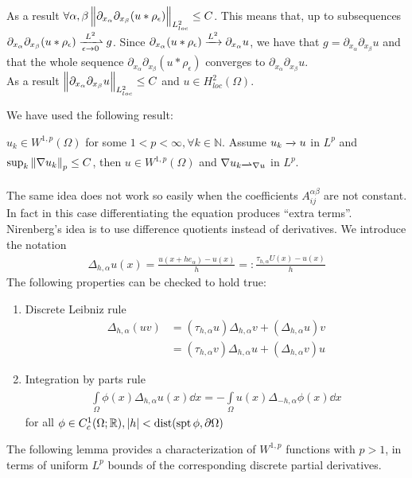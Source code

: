 As a result \( \forall \alpha ,\beta \, \norm{\partial_{x_{\alpha }}\partial_{x_{\beta}}(u\ast \rho _{\epsilon })}_{L_{loc}^{2}} \leq  C \). This means that, up to subsequences \( \partial_{x_{\alpha }}\partial_{x_{\beta}}(u\ast \rho _{\epsilon }) \myxrightharpoonup[\epsilon  \to 0]{L^{2}} g\). Since \( \partial_{x_{\alpha }}(u\ast \rho _{\epsilon }) \myxrightarrow[]{L^{2}} \partial_{x_{\alpha }} u \), we have that \( g = \partial_{x_{\alpha }}\partial_{x_{\beta}}u\) and that the whole sequence \( \partial_{x_{\alpha }}\partial_{x_{\beta}}(u\ast \rho _{\epsilon }) \) converges to \( \partial_{x_{\alpha }}\partial_{x_{\beta}}u \). \\
As a result \( \norm{\partial_{x_{\alpha }}\partial_{x_{\beta}}u}_{L_{loc}^{2}} \leq  C \) and \( u \in H_{loc}^{2} (\Omega )  \).\\
\par

We have used the following result:
\begin{lem}
    \( u_{k}\in W^{1,p}(\Omega )\) for some \( 1 < p < \infty, \forall k \in  \mathbb{N} \). Assume \( u_{k} \myxrightarrow[]{} u  \) in \( L^{p} \) and \( \sup_{k}\norm{\nabla u_{k}}_{p}\leq C \), then \( u\in W^{1,p}(\Omega ) \) and \( \nabla u_{k \myxrightharpoonup[]{}\nabla u} \) in \( L^{p} \).
\end{lem}
The same idea does not work so easily when the coefficients \( A_{ij}^{\alpha \beta } \) are not constant. In fact in this case differentiating the equation produces \enquote{extra terms}.\\
Nirenberg's idea is to use difference quotients instead of derivatives. We introduce the notation
\begin{gather}
    \Delta _{h, \alpha }u(x) = \frac{u(x+he_{\alpha})-u(x)}{h} =: \frac{\tau _{h, \alpha }U(x)-u(x) }{h }
\end{gather}
The following properties can be checked to hold true:
\begin{enumerate}[label= \( \bullet \)  ]
    \item Discrete Leibniz rule
          \begin{align}
              \Delta _{h, \alpha }(uv)
               & = (\tau _{h, \alpha } u) \Delta _{h,\alpha }v + (\Delta _{h, \alpha} u) v    \\
               & =    (\tau _{h, \alpha } v) \Delta _{h,\alpha }u + (\Delta _{h, \alpha} v) u
          \end{align}

    \item Integration by parts rule
          \begin{gather}
              \int\limits_{\Omega}^{} \phi (x) \Delta _{h, \alpha } u(x)   \dd{x} = -\int\limits_{\Omega}^{} u(x) \Delta _{-h, \alpha }\phi (x)    \dd{x}
          \end{gather}
          for all \( \phi \in  C_{c}^{1} (\Omega ; \mathbb{R}), \abs{h}< \operatorname{dist}(\operatorname{spt} \phi, \partial \Omega )  \)
\end{enumerate}
The following lemma provides a characterization of \( W^{1,p} \) functions with \( p>1 \), in terms of uniform \( L^{p} \) bounds of the corresponding discrete partial derivatives.

